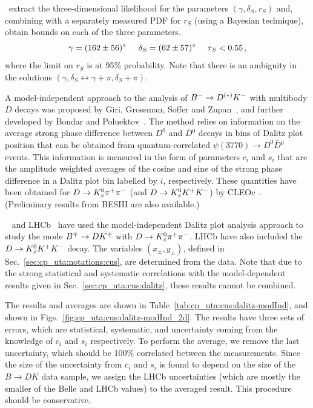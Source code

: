 \babar\ extract the three-dimensional likelihood for the parameters 
$\left( \gamma, \delta_S, r_S \right)$ and, combining with a separately
measured PDF for $r_S$ (using a Bayesian technique), obtain bounds on each of
the three parameters. 
\begin{equation}
  \gamma = (162 \pm 56)^\circ \hspace{5mm}
  \delta_S = (62 \pm 57)^\circ \hspace{5mm}
  r_S < 0.55  \, ,
\end{equation}
where the limit on $r_S$ is at 95\% probability.
Note that there is an ambiguity in the solutions 
$\left( \gamma, \delta_S \leftrightarrow \gamma+\pi, \delta_S+\pi \right)$.

\label{sec:cp_uta:cus:dalitz:modInd}

A model-independent approach to the analysis of $B^- \to D^{(*)} K^-$ with multibody $D$ decays was proposed by Giri, Grossman, Soffer and Zupan~\cite{Giri:2003ty}, and further developed by Bondar and Poluektov~\cite{Bondar:2005ki,Bondar:2008hh}. 
The method relies on information on the average strong phase difference between $D^0$ and $\bar{D}{}^0$ decays in bins of Dalitz plot position that can be obtained from quantum-correlated $\psi(3770) \to D^0\bar{D}{}^0$ events. 
This information is measured in the form of parameters $c_i$ and $s_i$ that are the amplitude weighted averages of the cosine and sine of the strong phase difference in a Dalitz plot bin labelled by $i$, respectively. 
These quantities have been obtained for $D \to K^0_{\scriptscriptstyle S} \pi^+\pi^-$ (and $D \to K^0_{\scriptscriptstyle S} K^+K^-$) by CLEOc~\cite{Briere:2009aa,Libby:2010nu}.  
(Preliminary results from BESIII are also available.)

\belle~\cite{Aihara:2012aw} and LHCb~\cite{Aaij:2012hu,Aaij:2014uva} have 
used the model-independent Dalitz plot analysis approach to study the mode 
$B^\mp \to DK^\mp$ with $D \to K^0_{\scriptscriptstyle S}\pi^+\pi^-$.
LHCb have also included the $D \to K^0_{\scriptscriptstyle S} K^+K^-$ decay.
The variables $(x_\pm, y_\pm)$, defined in Sec.~\ref{sec:cp_uta:notations:cus}, are determined from the data. 
Note that due to the strong statistical and systematic correlations with the model-dependent results given in Sec.~\ref{sec:cp_uta:cus:dalitz}, these results cannot be combined. 

The results and averages are shown in Table~\ref{tab:cp_uta:cus:dalitz-modInd}, and shown in Figs.~\ref{fig:cp_uta:cus:dalitz-modInd_2d}.
The results have three sets of errors, which are statistical, systematic, and uncertainty coming from the knowledge of $c_i$ and $s_i$ respectively. 
To perform the average, we remove the last uncertainty, which should be 100\% correlated between the measurements. 
Since the size of the uncertainty from $c_i$ and $s_i$ is found to depend on the size of the $B \to DK$ data sample, we assign the LHCb uncertainties (which are mostly the smaller of the Belle and LHCb values) to the averaged result. 
This procedure should be conservative. 

